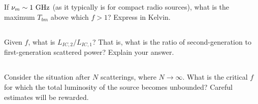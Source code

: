 \documentclass[11pt]{article}
\begin{document}
\subsection{}
If $\nu_m\sim1~{\rm GHz}$ (as it typically is for compact radio sources), what is the
maximum $T_{bm}$ above which $f>1$?  Express in Kelvin.

\subsection{}
Given $f$, what is $L_{IC,2}/L_{IC,1}$?  That is, what is the ratio of second-generation
to first-generation scattered power?  Explain your answer.

\subsection{}
Consider the situation after $N$ scatterings, where $N\rightarrow\infty$.  What is the 
critical $f$ for which the total luminosity of the source becomes unbounded?  Careful
estimates will be rewarded.
\end{document}
